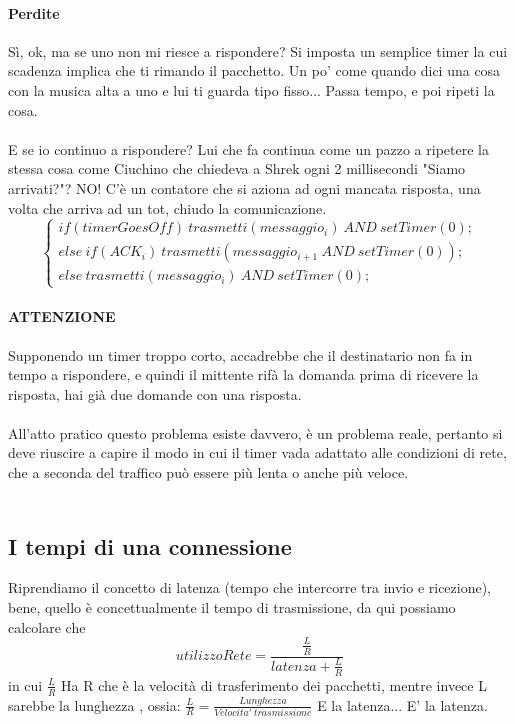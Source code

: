 \documentclass[12pt, a4paper, openany, twoside]{book}
\begin{document}
\paragraph{Perdite}
Sì, ok, ma se uno non mi riesce a rispondere? Si imposta un semplice timer
la cui scadenza implica che ti rimando il pacchetto. Un po' come quando dici
una cosa con la musica alta a uno e lui ti guarda tipo fisso... Passa tempo, e
poi ripeti la cosa. 
\\ \\ 
E se io continuo a rispondere? Lui che fa continua come un pazzo a ripetere la
stessa cosa come Ciuchino che chiedeva a Shrek ogni 2 millisecondi
"Siamo arrivati?"? NO! C'è un contatore che si aziona ad ogni mancata risposta,
una volta che arriva ad un tot, chiudo la comunicazione.
$$\begin{cases}
if(timerGoesOff) ~ trasmetti(messaggio_{i}) ~ AND ~ setTimer(0); \\
else ~if(ACK_{i}) ~trasmetti(messaggio_{i+1} ~ AND~  setTimer(0)); \\
else~ trasmetti(messaggio_{i}) ~ AND ~ setTimer(0);
\end{cases}$$
\paragraph{ATTENZIONE} Supponendo un timer troppo corto, accadrebbe che il 
destinatario non fa in tempo a rispondere, e quindi il mittente rifà la domanda
prima di ricevere la risposta, hai già due domande con una risposta. \\ \\ 
All'atto pratico questo problema esiste davvero, è un problema reale, pertanto si deve
riuscire a capire il modo in cui il timer vada adattato alle condizioni di rete,
che a seconda del traffico può essere più lenta o anche più veloce.\\ \\
\subsection{I tempi di una connessione}
Riprendiamo il concetto di latenza (tempo che intercorre tra invio e ricezione),
bene, quello è concettualmente il tempo di trasmissione, da qui possiamo calcolare che
$$utilizzoRete = \frac{\frac{L}{R}}{latenza+\frac{L}{R}}$$ 
in cui $\frac{L}{R}$ Ha R che è la velocità di trasferimento
dei pacchetti, mentre invece L sarebbe la lunghezza
, ossia: $\frac{L}{R} = \frac{Lunghezza}{Velocita'~trasmissione}$
E la latenza... E' la latenza. 
\end{document}
